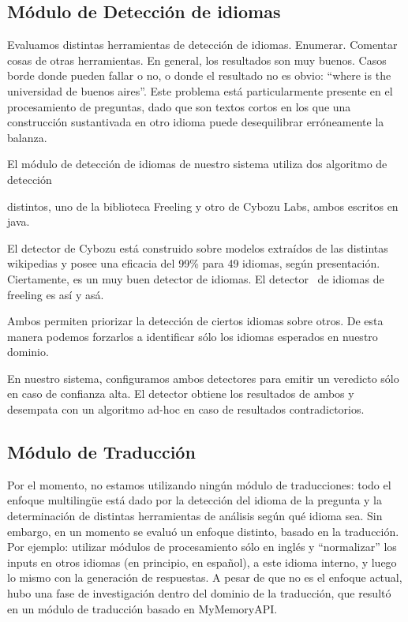 \subsection{M\'odulo de Detecci\'on de idiomas}

Evaluamos distintas herramientas de detecci\'on de idiomas. Enumerar.
Comentar cosas de otras herramientas. En general, los resultados son
muy buenos. Casos borde donde pueden fallar o no, o donde el resultado
no es obvio: {\textquotedblleft}where is the universidad de buenos
aires{\textquotedblright}. Este problema est\'a particularmente
presente en el procesamiento de preguntas, dado que son textos cortos
en los que una construcci\'on sustantivada en otro idioma puede
desequilibrar err\'oneamente la balanza. 

El m\'odulo de detecci\'on de idiomas de nuestro sistema utiliza dos
algoritmo de detecci\'on 

distintos, uno de la biblioteca Freeling y otro de Cybozu Labs, ambos
escritos en java. 

El detector de Cybozu est\'a construido sobre modelos extra\'idos de las
distintas wikipedias y posee una eficacia del 99\% para 49 idiomas,
seg\'un presentaci\'on. Ciertamente, es un muy buen detector de
idiomas. El detector \ de idiomas de freeling es as\'i y as\'a.

Ambos permiten priorizar la detecci\'on de ciertos idiomas sobre otros.
De esta manera podemos forzarlos a identificar s\'olo los idiomas
esperados en nuestro dominio. 

En nuestro sistema, configuramos ambos detectores para emitir un
veredicto s\'olo en caso de confianza alta. El detector obtiene los
resultados de ambos y desempata con un algoritmo ad-hoc en caso de
resultados contradictorios.

\subsection{M\'odulo de Traducci\'on}

Por el momento, no estamos utilizando ning\'un m\'odulo de traducciones:
todo el enfoque multiling\"ue est\'a dado por la detecci\'on del idioma
de la pregunta y la determinaci\'on de distintas herramientas de
an\'alisis seg\'un qu\'e idioma sea. Sin embargo, en un momento se
evalu\'o un enfoque distinto, basado en la traducci\'on. Por ejemplo:
utilizar m\'odulos de procesamiento s\'olo en ingl\'es y
{\textquotedblleft}normalizar{\textquotedblright} los inputs en otros
idiomas (en principio, en espa\~nol), a este idioma interno, y luego lo
mismo con la generaci\'on de respuestas. A pesar de que no es el
enfoque actual, hubo una fase de investigaci\'on dentro del dominio de
la traducci\'on, que result\'o en un m\'odulo de traducci\'on basado en
MyMemoryAPI.


